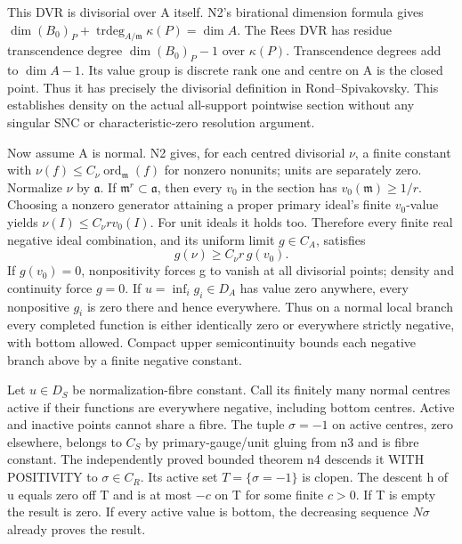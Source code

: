 \documentclass[11pt]{article}
\begin{document}
This DVR is divisorial over A itself. N2's birational dimension formula gives \(\dim(B_0)_P+\operatorname{trdeg}_{A/\mathfrak m}\kappa(P)=\dim A\). The Rees DVR has residue transcendence degree \(\dim(B_0)_P-1\) over \(\kappa(P)\). Transcendence degrees add to \(\dim A-1\). Its value group is discrete rank one and centre on A is the closed point. Thus it has precisely the divisorial definition in Rond--Spivakovsky. This establishes density on the actual all-support pointwise section without any singular SNC or characteristic-zero resolution argument.

Now assume A is normal. N2 gives, for each centred divisorial \(\nu\), a finite constant with \(\nu(f)\le C_\nu\operatorname{ord}_{\mathfrak m}(f)\) for nonzero nonunits; units are separately zero. Normalize \(\nu\) by \(\mathfrak a\). If \(\mathfrak m^r\subset\mathfrak a\), then every \(v_0\) in the section has \(v_0(\mathfrak m)\ge1/r\). Choosing a nonzero generator attaining a proper primary ideal's finite \(v_0\)-value yields \(\nu(I)\le C_\nu r v_0(I)\). For unit ideals it holds too. Therefore every finite real negative ideal combination, and its uniform limit \(g\in C_A\), satisfies
\[
g(\nu)\ge C_\nu r\,g(v_0).
\]
If \(g(v_0)=0\), nonpositivity forces g to vanish at all divisorial points; density and continuity force \(g=0\). If \(u=\inf_i g_i\in D_A\) has value zero anywhere, every nonpositive \(g_i\) is zero there and hence everywhere. Thus on a normal local branch every completed function is either identically zero or everywhere strictly negative, with bottom allowed. Compact upper semicontinuity bounds each negative branch above by a finite negative constant.

Let \(u\in D_S\) be normalization-fibre constant. Call its finitely many normal centres active if their functions are everywhere negative, including bottom centres. Active and inactive points cannot share a fibre. The tuple \(\sigma=-1\) on active centres, zero elsewhere, belongs to \(C_S\) by primary-gauge/unit gluing from n3 and is fibre constant. The independently proved bounded theorem n4 descends it WITH POSITIVITY to \(\sigma\in C_R\). Its active set \(T=\{\sigma=-1\}\) is clopen. The descent h of u equals zero off T and is at most \(-c\) on T for some finite \(c>0\). If T is empty the result is zero. If every active value is bottom, the decreasing sequence \(N\sigma\) already proves the result.
\end{document}
